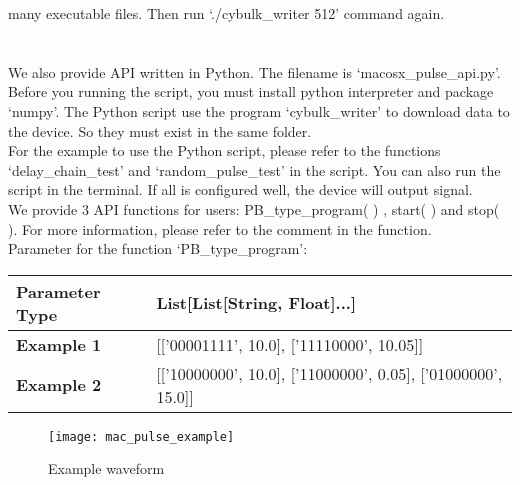 \hspace{-0.15cm}many executable files. Then run `./cybulk\_writer 512' command again.

\section{}

\hspace{-0.2cm}We also provide API written in Python. The filename is `macosx\_pulse\_api.py'. Before you running the script, you must install python interpreter and package `numpy'. The Python script use the program `cybulk\_writer' to download data to the device. So they must exist in the same folder.
\\
\indent \hspace{-0.2cm}For the example to use the Python script, please refer to the functions `delay\_chain\_test' and `random\_pulse\_test' in the script. You can also run the script in the terminal. If all is configured well, the device will output signal.
\\
\indent \hspace{-0.2cm}We provide 3 API functions for users: PB\_type\_program( ) , start( ) and stop( ). For more information, please refer to the comment in the function.
\\

\hspace{-0.2cm}Parameter for the function `PB\_type\_program':

\vspace{0.2cm}
\begin{table}[H]
\centering
\normalsize
\begin{tabular}{|m{4cm}<{\centering}|m{6cm}<{\centering}|}
\hline \textbf{Parameter Type} & List[List[String, Float]...]
\\
\hline \textbf{Example 1} & [['00001111', 10.0], ['11110000', 10.05]]
\\
\hline \textbf{Example 2} & [['10000000', 10.0], ['11000000', 0.05], ['01000000', 15.0]] \\\hline
\end{tabular}
\end{table}

\begin{figure}[ht]
\centering
\texttt{[image: mac\_pulse\_example]}
\caption{\hspace{0.2cm}Example waveform}
\label{pulse_example_mac}
\end{figure}

